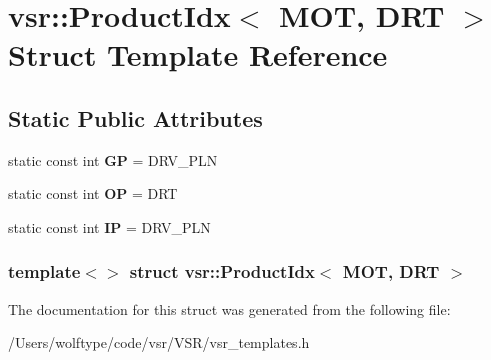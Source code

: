 \hypertarget{structvsr_1_1_product_idx_3_01_m_o_t_00_01_d_r_t_01_4}{\section{vsr\-:\-:Product\-Idx$<$ M\-O\-T, D\-R\-T $>$ Struct Template Reference}
\label{structvsr_1_1_product_idx_3_01_m_o_t_00_01_d_r_t_01_4}
}
\subsection*{Static Public Attributes}
\begin{DoxyCompactItemize}
\item 
\hypertarget{structvsr_1_1_product_idx_3_01_m_o_t_00_01_d_r_t_01_4_a3633c5de32bc754afab3d327ba31a5e4}{static const int {\bfseries G\-P} = D\-R\-V\-\_\-\-P\-L\-N}\label{structvsr_1_1_product_idx_3_01_m_o_t_00_01_d_r_t_01_4_a3633c5de32bc754afab3d327ba31a5e4}

\item 
\hypertarget{structvsr_1_1_product_idx_3_01_m_o_t_00_01_d_r_t_01_4_a831aa4ea7f58358966112db346ad4827}{static const int {\bfseries O\-P} = D\-R\-T}\label{structvsr_1_1_product_idx_3_01_m_o_t_00_01_d_r_t_01_4_a831aa4ea7f58358966112db346ad4827}

\item 
\hypertarget{structvsr_1_1_product_idx_3_01_m_o_t_00_01_d_r_t_01_4_abc7b92df67d884c25d45c84e621dbb93}{static const int {\bfseries I\-P} = D\-R\-V\-\_\-\-P\-L\-N}\label{structvsr_1_1_product_idx_3_01_m_o_t_00_01_d_r_t_01_4_abc7b92df67d884c25d45c84e621dbb93}

\end{DoxyCompactItemize}
\subsubsection*{template$<$$>$ struct vsr\-::\-Product\-Idx$<$ M\-O\-T, D\-R\-T $>$}



The documentation for this struct was generated from the following file\-:\begin{DoxyCompactItemize}
\item 
/\-Users/wolftype/code/vsr/\-V\-S\-R/vsr\-\_\-templates.\-h\end{DoxyCompactItemize}
